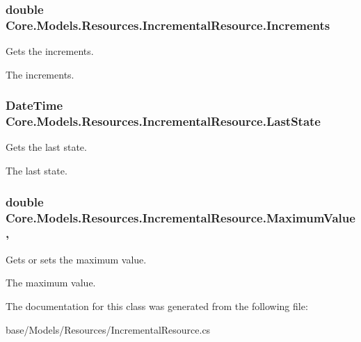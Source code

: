 \subsubsection[{Increments}]{\setlength{\rightskip}{0pt plus 5cm}double Core.\+Models.\+Resources.\+Incremental\+Resource.\+Increments\hspace{0.3cm}{\ttfamily [get]}}\label{classCore_1_1Models_1_1Resources_1_1IncrementalResource_acbe6bfafc812c2fc407648f577978b95}


Gets the increments. 

The increments.\hypertarget{classCore_1_1Models_1_1Resources_1_1IncrementalResource_a2aa8fc33796b301d8682f351e2cc0658}{}
\subsubsection[{Last\+State}]{\setlength{\rightskip}{0pt plus 5cm}Date\+Time Core.\+Models.\+Resources.\+Incremental\+Resource.\+Last\+State\hspace{0.3cm}{\ttfamily [get]}}\label{classCore_1_1Models_1_1Resources_1_1IncrementalResource_a2aa8fc33796b301d8682f351e2cc0658}


Gets the last state. 

The last state.\hypertarget{classCore_1_1Models_1_1Resources_1_1IncrementalResource_ad761090c40b93c8987b9ec3fc244c461}{}
\subsubsection[{Maximum\+Value}]{\setlength{\rightskip}{0pt plus 5cm}double Core.\+Models.\+Resources.\+Incremental\+Resource.\+Maximum\+Value\hspace{0.3cm}{\ttfamily [get]}, {\ttfamily [set]}}\label{classCore_1_1Models_1_1Resources_1_1IncrementalResource_ad761090c40b93c8987b9ec3fc244c461}


Gets or sets the maximum value. 

The maximum value.

The documentation for this class was generated from the following file\+:\begin{DoxyCompactItemize}
\item 
base/\+Models/\+Resources/Incremental\+Resource.\+cs\end{DoxyCompactItemize}
